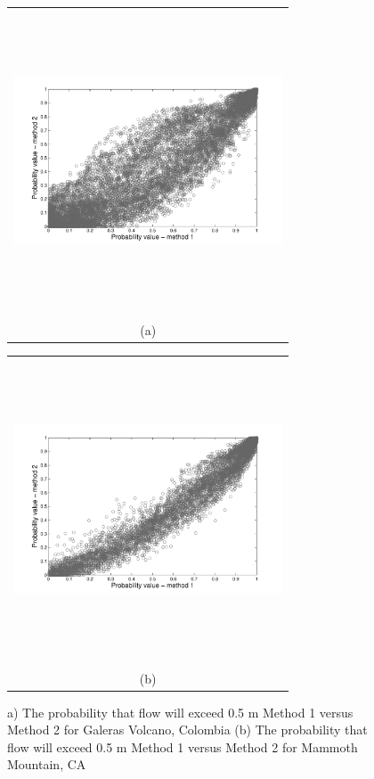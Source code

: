 \documentclass[12pt]{article}
\newcommand{\Pic}[2][0.85]{\begin{center}\texttt{[image: \#2]}
 \end{center} }
\begin{document}
\begin{figure}[H]
    \begin{minipage}[b]{0.6\textwidth}
        \begin{tabular}{c}
       \includegraphics[width=8cm,height=9cm,keepaspectratio]{figs_pdf/cloud_galeras.pdf}\\
        (a)
        \end{tabular}
    \end{minipage}
    \begin{minipage}{0.6\textwidth}
        \begin{tabular}{c}
	\includegraphics[width=8cm,height=9cm,keepaspectratio]{figs_pdf/cloud_mammoth.pdf}\\
        (b)
        \end{tabular}
    \end{minipage} 
    \caption{a) The probability that flow will exceed 0.5 m Method 1
      versus Method 2 for Galeras Volcano, Colombia (b) The
      probability that flow will exceed 0.5 m Method 1 versus Method 2
      for Mammoth Mountain, CA }
\label{fig5}  
\end{figure}
\end{document}
